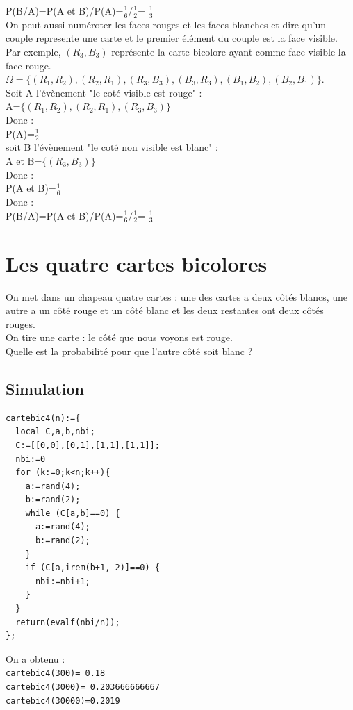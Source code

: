 \documentclass[a4paper,11pt]{book}
\begin{document}
P(B/A)=P(A et B)/P(A)=$\displaystyle \frac{1}{6}$/$\displaystyle \frac{1}{2}$=
$\displaystyle \frac{1}{3}$\\
On peut aussi num\'eroter les faces rouges et les faces blanches et dire qu'un 
couple represente une carte et le premier \'el\'ement du couple est la face 
visible.\\
Par exemple, $(R_3,B_3)$ repr\'esente la carte bicolore ayant comme face
 visible la face rouge.\\
$\Omega=\{(R_1,R_2),(R_2,R_1),(R_3,B_3),(B_3,R_3),(B_1,B_2),(B_2,B_1)\}$.\\
Soit A l'\'ev\`enement "le cot\'e visible est rouge" :\\
A=$\{(R_1,R_2),(R_2,R_1),(R_3,B_3)\}$\\
Donc :\\
P(A)=$\displaystyle \frac{1}{2}$\\
soit B l'\'ev\`enement "le cot\'e non visible est blanc" :\\
A et B=$\{(R_3,B_3)\}$\\
Donc :\\
P(A et B)=$\displaystyle \frac{1}{6}$\\
Donc :\\
P(B/A)=P(A et B)/P(A)=$\displaystyle \frac{1}{6}/ \frac{1}{2}$=
$\displaystyle \frac{1}{3}$\\
\section{Les quatre cartes bicolores}
On met dans un chapeau quatre cartes : une des cartes a deux c\^ot\'es blancs,
 une autre a un c\^ot\'e rouge et un c\^ot\'e blanc et les deux restantes ont
 deux c\^ot\'es rouges.\\
On tire une carte : le c\^ot\'e que nous voyons est rouge.\\
Quelle est la probabilit\'e pour que l'autre c\^ot\'e soit blanc ?   
\subsection{Simulation}
\begin{verbatim}
cartebic4(n):={
  local C,a,b,nbi;
  C:=[[0,0],[0,1],[1,1],[1,1]];
  nbi:=0
  for (k:=0;k<n;k++){
    a:=rand(4);
    b:=rand(2);
    while (C[a,b]==0) {
      a:=rand(4);
      b:=rand(2);
    }
    if (C[a,irem(b+1, 2)]==0) {
      nbi:=nbi+1;
    }
  }
  return(evalf(nbi/n));
};
\end{verbatim} 
On a obtenu :\\
{\tt cartebic4(300)= 0.18}\\ 
{\tt cartebic4(3000)= 0.203666666667}\\
{\tt cartebic4(30000)=0.2019}
\end{document}
